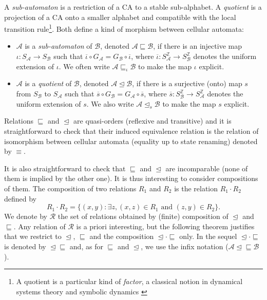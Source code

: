 \documentclass[a4paper]{elsarticle}
\newcommand{\ZZ}{\mathbb{Z}}
\newcommand{\ACA}{\mathcal{A}}
\newcommand{\ACB}{\mathcal{B}}
\newcommand{\globA}{G_{\ACA}}
\newcommand{\globB}{G_{\ACB}}
\newcommand\alphabe[1]{S_{#1}}
\newcommand{\alphA}{\alphabe{\ACA}}
\newcommand{\alphB}{\alphabe{\ACB}}
\newcommand{\unif}{\overline}
\newcommand\sac{\sqsubseteq}
\newcommand{\sacby}[1]{\sqsubseteq_{#1}}
\newcommand{\fac}{\trianglelefteq}
\newcommand{\facby}[1]{\trianglelefteq_{#1}}
\newcommand{\facsac}{\fac\!\sac}
\newcommand{\isom}{\equiv}
\newcommand{\locrelset}{\mathcal{R}}
\begin{document}
A \emph{sub-automaton} is a restriction of a CA to a stable
sub-alphabet. A \emph{quotient} is a projection of a CA onto a smaller
alphabet and compatible with the local transition rule\footnote{A
  quotient is a particular kind of \emph{factor}, a classical notion
  in dynamical systems theory and symbolic dynamics \cite{kurkabook}}.
Both define a kind of morphism between cellular automata:

\begin{itemize}
\item $\ACA$ is a \emph{sub-automaton} of $\ACB$, denoted
  ${\ACA\sac\ACB}$, if there is an injective map
  ${\iota:\alphA\rightarrow\alphB}$ such that
  ${\unif{\iota}\circ\globA=\globB\circ \unif{\iota}}$, where
  ${\unif{\iota}:\alphA^\ZZ\rightarrow \alphB^\ZZ}$ denotes the
  uniform extension of $\iota$. We often write $\ACA\sacby{\iota}\ACB$
  to make the map $\iota$ explicit.
    
\item $\ACA$ is a \emph{quotient} of $\ACB$, denoted ${\ACA\fac\ACB}$,
  if there is a surjective (onto) map $s$ from $\alphB$ to $\alphA$
  such that ${\unif{s}\circ\globB=\globA\circ \unif{s}}$, where
  ${\unif{s}:\alphB^\ZZ\rightarrow \alphA^\ZZ}$ denotes the uniform
  extension of $s$. We also write $\ACA\facby{s}\ACB$ to make the map
  $s$ explicit.
\end{itemize}

Relations $\sac$ and $\fac$ are quasi-orders (reflexive and
transitive) and it is straightforward to check that their induced
equivalence relation is the relation of isomorphism between cellular
automata (equality up to state renaming) denoted by $\isom$.

It is also straightforward to check that $\sac$ and $\fac$ are
incomparable (none of them is implied by the other one). It is thus
interesting to consider compositions of them. The composition of two
relations $R_1$ and $R_2$ is the relation $R_1\cdot R_2$ defined by
\[R_1\cdot R_2 = \{(x,y) : \exists z, (x,z)\in R_1\text{ and }(z,y)\in
R_2\}.
\]
We denote by $\locrelset$ the set of relations obtained by (finite)
composition of $\fac$ and $\sac$. Any relation of $\locrelset$ is a
priori interesting, but the following theorem justifies that we
restrict to $\fac$, $\sac$ and the composition $\fac\cdot\sac$ only.  In
the sequel $\fac\cdot\sac$ is denoted by $\facsac$ and, as for $\sac$ and
$\fac$, we use the infix notation (${\ACA\facsac\ACB}$).
\end{document}
